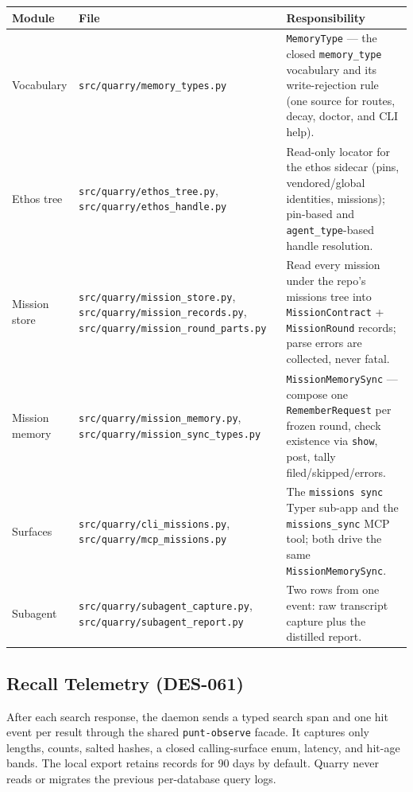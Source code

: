 \documentclass[a4paper,10pt]{article}
\newcommand{\modpath}[1]{\texttt{src/quarry/#1}}
\begin{document}
\begin{center}
\begin{tabular}{llp{6.6cm}}
\toprule
\textbf{Module} & \textbf{File} & \textbf{Responsibility} \\
\midrule
Vocabulary  & \modpath{memory\_types.py}      & \texttt{MemoryType} ---
              the closed \texttt{memory\_type} vocabulary and its
              write-rejection rule (one source for routes, decay, doctor,
              and CLI help). \\
Ethos tree  & \modpath{ethos\_tree.py},
              \modpath{ethos\_handle.py}      & Read-only locator for the
              ethos sidecar (pins, vendored/global identities, missions);
              pin-based and \texttt{agent\_type}-based handle resolution. \\
Mission store & \modpath{mission\_store.py},
              \modpath{mission\_records.py},
              \modpath{mission\_round\_parts.py} & Read every mission under
              the repo's missions tree into \texttt{MissionContract} +
              \texttt{MissionRound} records; parse errors are collected,
              never fatal. \\
Mission memory & \modpath{mission\_memory.py},
              \modpath{mission\_sync\_types.py} & \texttt{MissionMemorySync}
              --- compose one \texttt{RememberRequest} per frozen round,
              check existence via \texttt{show}, post, tally
              filed/skipped/errors. \\
Surfaces    & \modpath{cli\_missions.py},
              \modpath{mcp\_missions.py}      & The \texttt{missions sync}
              Typer sub-app and the \texttt{missions\_sync} MCP tool; both
              drive the same \texttt{MissionMemorySync}. \\
Subagent    & \modpath{subagent\_capture.py},
              \modpath{subagent\_report.py}   & Two rows from one event:
              raw transcript capture plus the distilled report. \\
\bottomrule
\end{tabular}
\end{center}

\subsection{Recall Telemetry (DES-061)}

After each search response, the daemon sends a typed search span and one hit
event per result through the shared \texttt{punt-observe} facade. It captures
only lengths, counts, salted hashes, a closed calling-surface enum, latency,
and hit-age bands. The local export retains records for 90 days by default.
Quarry never reads or migrates the previous per-database query logs.
\end{document}
